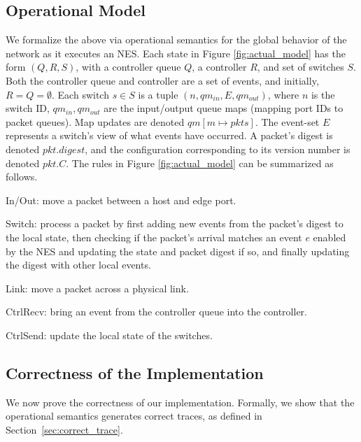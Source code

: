 \documentclass[pldi-cameraready]{sigplanconf}
\newcommand{\pkts}{\ensuremath{\mathit{pkts}}}
\newcommand{\pkt}{\ensuremath{\mathit{pkt}}}
\begin{document}
\subsection{Operational Model}
\label{subsec:model}

We formalize the above via operational semantics for the global
behavior of the network as it executes an NES.
Each state in Figure \ref{fig:actual_model} has the form $(Q,R,S)$,
with a controller queue $Q$, a controller $R$, and set of switches
$S$.  Both the controller queue and controller are a set of events,
and initially, $R{=}Q{=}\emptyset$.
Each switch $s\in S$ is a tuple $(n,qm_{in},E,qm_{out})$, where $n$ is
the switch ID, $qm_{in}, qm_{out}$ are the input/output queue maps
(mapping port IDs to packet queues).
Map updates are denoted $qm[m \mapsto \pkts]$.
The event-set $E$ represents a switch's view of what events have
occurred.
A packet's digest is denoted $\pkt.digest$, and the configuration
corresponding to its version number is denoted $\pkt.C$.
The rules in Figure \ref{fig:actual_model} can be summarized as follows.
\begin{compactitem}
\item {\sc In/Out}: move a packet between a host and edge port.
\item {\sc Switch}: process a packet by first adding new events from the
  packet's digest to the local state, then checking if the packet's
  arrival matches an event $e$ enabled by the NES and updating the
  state and packet digest if so, and finally updating the digest with
  other local events.
\item {\sc Link}: move a packet across a physical link.
\item {\sc CtrlRecv}: bring an event from the controller
  queue into the controller.
\item {\sc CtrlSend}: update the local state of the switches.
\end{compactitem}

\subsection{Correctness of the Implementation}
\label{sec:correctness}

We now prove the correctness of our implementation. Formally, we show
that the operational semantics generates correct traces, as defined in Section~\ref{sec:correct_trace}.


\renewcommand*{\proofname}{Proof Sketch}
\end{document}
